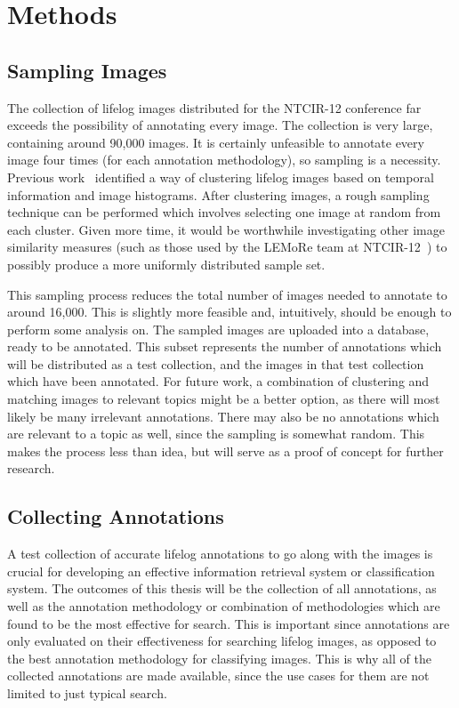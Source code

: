 \section{Methods}

\subsection{Sampling Images}

The collection of lifelog images distributed for the NTCIR-12 conference far exceeds the possibility of annotating every image. The collection is very large, containing around 90,000 images. It is certainly unfeasible to annotate every image four times (for each annotation methodology), so sampling is a necessity. Previous work~\citep{scells2016qut} identified a way of clustering lifelog images based on temporal information and image histograms. After clustering images, a rough sampling technique can be performed which involves selecting one image at random from each cluster. Given more time, it would be worthwhile investigating other image similarity measures (such as those used by the LEMoRe team at NTCIR-12~\citep{de40lemore}) to possibly produce a more uniformly distributed sample set.

This sampling process reduces the total number of images needed to annotate to around 16,000. This is slightly more feasible and, intuitively, should be enough to perform some analysis on. The sampled images are uploaded into a database, ready to be annotated. This subset represents the number of annotations which will be distributed as a test collection, and the images in that test collection which have been annotated. For future work, a combination of clustering and matching images to relevant topics might be a better option, as there will most likely be many irrelevant annotations. There may also be no annotations which are relevant to a topic as well, since the sampling is somewhat random. This makes the process less than idea, but will serve as a proof of concept for further research.

\subsection{Collecting Annotations}

A test collection of accurate lifelog annotations to go along with the images is crucial for developing an effective information retrieval system or classification system. The outcomes of this thesis will be the collection of all annotations, as well as the annotation methodology or combination of methodologies which are found to be the most effective for search. This is important since annotations are only evaluated on their effectiveness for searching lifelog images, as opposed to the best annotation methodology for classifying images. This is why all of the collected annotations are made available, since the use cases for them are not limited to just typical search.

